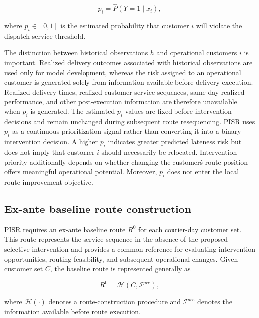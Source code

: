 \documentclass[11pt,a4paper]{article}
\begin{document}
\begin{equation}
p_{i} = \widehat{P}\left( Y = 1 \mid x_{i} \right),
\label{eq:5}
\end{equation}

where \(p_{i} \in \left\lbrack 0,1 \right\rbrack\) is the estimated
probability that customer \(i\) will violate the dispatch service threshold.

The distinction between historical observations \(h\) and operational
customers \(i\) is important. Realized delivery outcomes associated with
historical observations are used only for model development, whereas the
risk assigned to an operational customer is generated solely from
information available before delivery execution. Realized delivery
times, realized customer service sequences, same-day realized
performance, and other post-execution information are therefore
unavailable when \(p_{i}\) is generated. The estimated \(p_{i}\) values
are fixed before intervention decisions and remain unchanged during
subsequent route resequencing. PISR uses \(p_{i}\) as a continuous
prioritization signal rather than converting it into a binary
intervention decision. A higher \(p_{i}\) indicates greater predicted
lateness risk but does not imply that customer \(i\) should necessarily
be relocated. Intervention priority additionally depends on whether
changing the customer\'s route position offers meaningful
operational potential. Moreover, \(p_{i}\) does not enter the local
route-improvement objective.

\subsection{Ex-ante baseline route construction}\label{sec:baseline-route}

PISR requires an ex-ante baseline route \(R^{0}\) for each courier-day
customer set. This route represents the service sequence in the absence
of the proposed selective intervention and provides a common reference
for evaluating intervention opportunities, routing feasibility, and
subsequent operational changes. Given customer set \(C\), the baseline
route is represented generally as

\begin{equation}
R^{0}\mathcal{= H}\left( C,\mathcal{I}^{pre} \right),
\label{eq:6}
\end{equation}

where \(\mathcal{H}( \cdot )\) denotes a route-construction procedure and
\(\mathcal{I}^{pre}\) denotes the information available before route
execution.
\end{document}
